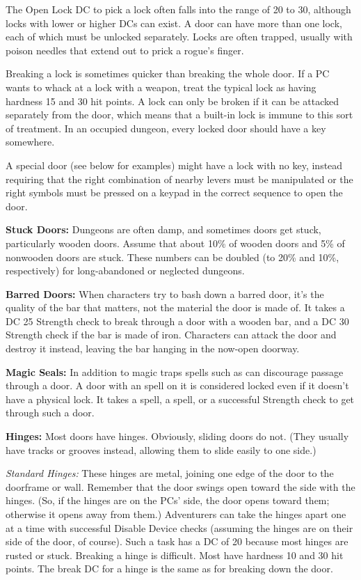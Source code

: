 The Open Lock DC to pick a lock often falls into the range of 20 to 30, although 
locks with lower or higher DCs can exist. A door can have more than one lock, each 
of which must be unlocked separately. Locks are often trapped, usually with poison 
needles that extend out to prick a rogue's finger.

Breaking a lock is sometimes quicker than breaking the whole door. If a PC wants 
to whack at a lock with a weapon, treat the typical lock as having hardness 15 
and 30 hit points. A lock can only be broken if it can be attacked separately from 
the door, which means that a built-in lock is immune to this sort of treatment. 
In an occupied dungeon, every locked door should have a key somewhere. 

A special door (see below for examples) might have a lock with no key, instead 
requiring that the right combination of nearby levers must be manipulated or the 
right symbols must be pressed on a keypad in the correct sequence to open the door.

\textbf{Stuck Doors:} Dungeons are often damp, and sometimes doors get stuck, particularly 
wooden doors. Assume that about 10\% of wooden doors and 5\% of nonwooden doors 
are stuck. These numbers can be doubled (to 20\% and 10\%, respectively) for long-abandoned 
or neglected dungeons.

\textbf{Barred Doors:} When characters try to bash down a barred door, it's the 
quality of the bar that matters, not the material the door is made of. It takes 
a DC 25 Strength check to break through a door with a wooden bar, and a DC 30 Strength 
check if the bar is made of iron. Characters can attack the door and destroy it 
instead, leaving the bar hanging in the now-open doorway.

\textbf{Magic Seals:} In addition to magic traps spells such as 
can discourage passage through a door. A door with an 
spell on it is considered locked even if it doesn't have a physical lock. It takes 
a  spell, a  spell, or a successful Strength 
check to get through such a door.

\textbf{Hinges:} Most doors have hinges. Obviously, sliding doors do not. (They 
usually have tracks or grooves instead, allowing them to slide easily to one side.)

\textit{Standard Hinges:} These hinges are metal, joining one edge of the door 
to the doorframe or wall. Remember that the door swings open toward the side with 
the hinges. (So, if the hinges are on the PCs' side, the door opens toward them; 
otherwise it opens away from them.) Adventurers can take the hinges apart one at 
a time with successful Disable Device checks (assuming the hinges are on their 
side of the door, of course). Such a task has a DC of 20 because most hinges are 
rusted or stuck. Breaking a hinge is difficult. Most have hardness 10 and 30 hit 
points. The break DC for a hinge is the same as for breaking down the door.

